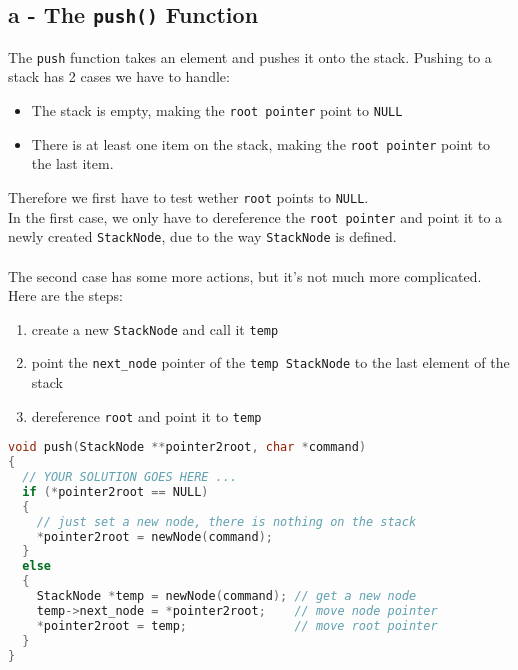 \documentclass[a4paper, 11pt]{article}
\begin{document}
    \subsection{a - The \texttt{push()} Function}
    The \texttt{push} function takes an element and pushes it onto the stack.
    Pushing to a stack has 2 cases we have to handle:
    \begin{itemize}
        \item The stack is empty, making the \texttt{root pointer} point to \lstinline{NULL}
        \item There is at least one item on the stack, making the \texttt{root pointer} point to the last item.
    \end{itemize}
    Therefore we first have to test wether \texttt{root} points to \lstinline{NULL}.
    \\
    In the first case, we only have to dereference the \texttt{root pointer} and point it to a newly created 
    \texttt{StackNode}, due to the way \texttt{StackNode} is defined.
    \\\\
    The second case has some more actions, but it's not much more complicated. Here are the steps:
    \begin{enumerate}
        \item create a new \texttt{StackNode} and call it \texttt{temp}
        \item point the \texttt{next\_node} pointer of the \texttt{temp StackNode} to the 
              last element of the stack
        \item dereference \texttt{root} and point it to \texttt{temp}
    \end{enumerate}
    \begin{lstlisting}[language=C,caption={The \texttt{push()} Function},label={push}]
void push(StackNode **pointer2root, char *command)
{
  // YOUR SOLUTION GOES HERE ...
  if (*pointer2root == NULL)
  {
    // just set a new node, there is nothing on the stack
    *pointer2root = newNode(command); 
  }
  else
  {
    StackNode *temp = newNode(command); // get a new node
    temp->next_node = *pointer2root;    // move node pointer
    *pointer2root = temp;               // move root pointer
  }
}
    \end{lstlisting}
\end{document}
